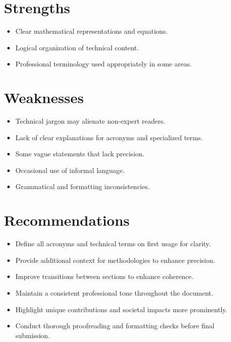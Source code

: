 \documentclass[11pt]{article}
\begin{document}
\section{Strengths}
\begin{itemize}
    \item Clear mathematical representations and equations.
    \item Logical organization of technical content.
    \item Professional terminology used appropriately in some areas.
\end{itemize}

\section{Weaknesses}
\begin{itemize}
    \item Technical jargon may alienate non-expert readers.
    \item Lack of clear explanations for acronyms and specialized terms.
    \item Some vague statements that lack precision.
    \item Occasional use of informal language.
    \item Grammatical and formatting inconsistencies.
\end{itemize}

\section{Recommendations}
\begin{itemize}
    \item Define all acronyms and technical terms on first usage for clarity.
    \item Provide additional context for methodologies to enhance precision.
    \item Improve transitions between sections to enhance coherence.
    \item Maintain a consistent professional tone throughout the document.
    \item Highlight unique contributions and societal impacts more prominently.
    \item Conduct thorough proofreading and formatting checks before final submission.
\end{itemize}
\end{document}
